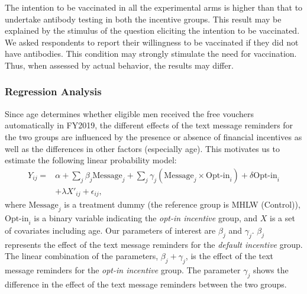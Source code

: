 \documentclass[
  11pt,
  a4paper
]{article}
\begin{document}
The intention to be vaccinated in all the experimental arms is higher than that to undertake antibody testing in both the incentive groups. This result may be explained by the stimulus of the question eliciting the intention to be vaccinated. We asked respondents to report their willingness to be vaccinated if they did not have antibodies. This condition may strongly stimulate the need for vaccination. Thus, when assessed by actual behavior, the results may differ.

\hypertarget{regression-analysis}{%
\subsubsection{Regression Analysis}\label{regression-analysis}}

Since age determines whether eligible men received the free vouchers automatically in FY2019, the different effects of the text message reminders for the two groups are influenced by the presence or absence of financial incentives as well as the differences in other factors (especially age). This motivates us to estimate the following linear probability model:
\begin{equation}
\begin{split}
Y_{ij} = &\alpha + \sum_j \beta_j \text{Message}_j + \sum_j \gamma_j (\text{Message}_j \times \text{Opt-in}_i) + \delta \text{Opt-in}_i \\
&+ \lambda X'_{ij} + \epsilon_{ij},
\end{split} \label{eq:regression}
\end{equation}
where \(\text{Message}_j\) is a treatment dummy (the reference group is MHLW (Control)), \(\text{Opt-in}_i\) is a binary variable indicating the \emph{opt-in incentive} group, and \(X\) is a set of covariates including age. Our parameters of interest are \(\beta_j\) and \(\gamma_j\). \(\beta_j\) represents the effect of the text message reminders for the \emph{default incentive} group. The linear combination of the parameters, \(\beta_j + \gamma_j\), is the effect of the text message reminders for the \emph{opt-in incentive} group. The parameter \(\gamma_j\) shows the difference in the effect of the text message reminders between the two groups.
\end{document}
